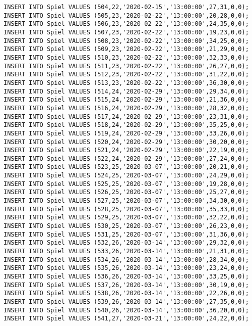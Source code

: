 \documentclass{bschlangaul-aufgabe}
\begin{document}
\begin{verbatim}
INSERT INTO Spiel VALUES (504,22,'2020-02-15','13:00:00',27,31,0,0);
INSERT INTO Spiel VALUES (505,23,'2020-02-22','13:00:00',20,28,0,0);
INSERT INTO Spiel VALUES (506,23,'2020-02-22','13:00:00',24,35,0,0);
INSERT INTO Spiel VALUES (507,23,'2020-02-22','13:00:00',19,23,0,0);
INSERT INTO Spiel VALUES (508,23,'2020-02-22','13:00:00',34,25,0,0);
INSERT INTO Spiel VALUES (509,23,'2020-02-22','13:00:00',21,29,0,0);
INSERT INTO Spiel VALUES (510,23,'2020-02-22','13:00:00',32,33,0,0);
INSERT INTO Spiel VALUES (511,23,'2020-02-22','13:00:00',26,27,0,0);
INSERT INTO Spiel VALUES (512,23,'2020-02-22','13:00:00',31,22,0,0);
INSERT INTO Spiel VALUES (513,23,'2020-02-22','13:00:00',36,30,0,0);
INSERT INTO Spiel VALUES (514,24,'2020-02-29','13:00:00',29,34,0,0);
INSERT INTO Spiel VALUES (515,24,'2020-02-29','13:00:00',21,36,0,0);
INSERT INTO Spiel VALUES (516,24,'2020-02-29','13:00:00',28,32,0,0);
INSERT INTO Spiel VALUES (517,24,'2020-02-29','13:00:00',23,31,0,0);
INSERT INTO Spiel VALUES (518,24,'2020-02-29','13:00:00',35,25,0,0);
INSERT INTO Spiel VALUES (519,24,'2020-02-29','13:00:00',33,26,0,0);
INSERT INTO Spiel VALUES (520,24,'2020-02-29','13:00:00',30,20,0,0);
INSERT INTO Spiel VALUES (521,24,'2020-02-29','13:00:00',22,19,0,0);
INSERT INTO Spiel VALUES (522,24,'2020-02-29','13:00:00',27,24,0,0);
INSERT INTO Spiel VALUES (523,25,'2020-03-07','13:00:00',20,21,0,0);
INSERT INTO Spiel VALUES (524,25,'2020-03-07','13:00:00',24,29,0,0);
INSERT INTO Spiel VALUES (525,25,'2020-03-07','13:00:00',19,28,0,0);
INSERT INTO Spiel VALUES (526,25,'2020-03-07','13:00:00',25,27,0,0);
INSERT INTO Spiel VALUES (527,25,'2020-03-07','13:00:00',34,30,0,0);
INSERT INTO Spiel VALUES (528,25,'2020-03-07','13:00:00',35,33,0,0);
INSERT INTO Spiel VALUES (529,25,'2020-03-07','13:00:00',32,22,0,0);
INSERT INTO Spiel VALUES (530,25,'2020-03-07','13:00:00',26,23,0,0);
INSERT INTO Spiel VALUES (531,25,'2020-03-07','13:00:00',31,36,0,0);
INSERT INTO Spiel VALUES (532,26,'2020-03-14','13:00:00',29,32,0,0);
INSERT INTO Spiel VALUES (533,26,'2020-03-14','13:00:00',21,31,0,0);
INSERT INTO Spiel VALUES (534,26,'2020-03-14','13:00:00',28,34,0,0);
INSERT INTO Spiel VALUES (535,26,'2020-03-14','13:00:00',23,24,0,0);
INSERT INTO Spiel VALUES (536,26,'2020-03-14','13:00:00',33,25,0,0);
INSERT INTO Spiel VALUES (537,26,'2020-03-14','13:00:00',30,19,0,0);
INSERT INTO Spiel VALUES (538,26,'2020-03-14','13:00:00',22,26,0,0);
INSERT INTO Spiel VALUES (539,26,'2020-03-14','13:00:00',27,35,0,0);
INSERT INTO Spiel VALUES (540,26,'2020-03-14','13:00:00',36,20,0,0);
INSERT INTO Spiel VALUES (541,27,'2020-03-21','13:00:00',24,22,0,0);

\end{verbatim}
\end{document}
